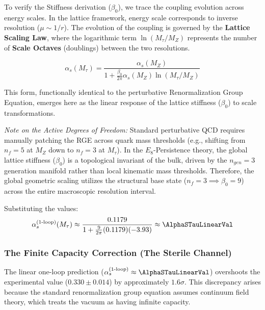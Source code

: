 To verify the Stiffness derivation ($\beta_0$), we trace the coupling evolution across energy scales. In the lattice framework, energy scale corresponds to inverse resolution ($\mu \sim 1/r$). The evolution of the coupling is governed by the \textbf{Lattice Scaling Law}, where the logarithmic term $\ln(M_\tau/M_Z)$ represents the number of \textbf{Scale Octaves} (doublings) between the two resolutions.

\begin{equation}
\alpha_s(M_\tau) = \frac{\alpha_s(M_Z)}{1 + \frac{\beta_0}{2\pi} \alpha_s(M_Z) \ln(M_\tau/M_Z)}
\end{equation}

This form, functionally identical to the perturbative Renormalization Group Equation, emerges here as the linear response of the lattice stiffness ($\beta_0$) to scale transformations.

\textit{Note on the Active Degrees of Freedom:} Standard perturbative QCD requires manually patching the RGE across quark mass thresholds (e.g., shifting from $n_f=5$ at $M_Z$ down to $n_f=3$ at $M_\tau$). In the $E_8$-Persistence theory, the global lattice stiffness ($\beta_0$) is a topological invariant of the bulk, driven by the $n_{gen}=3$ generation manifold rather than local kinematic mass thresholds. Therefore, the global geometric scaling utilizes the structural base state ($n_f = 3 \implies \beta_0 = 9$) across the entire macroscopic resolution interval. 

Substituting the values:
\begin{equation}
\alpha_s^{\text{(1-loop)}}(M_\tau) \approx \frac{0.1179}{1 + \frac{9}{2\pi}(0.1179)(-3.93)} \approx \AlphaSTauLinearVal
\end{equation}


\subsubsection{The Finite Capacity Correction (The Sterile Channel)}

The linear one-loop prediction ($\alpha_s^{\text{(1-loop)}} \approx \AlphaSTauLinearVal$) overshoots the experimental value ($0.330 \pm 0.014$) by approximately $1.6\sigma$. This discrepancy arises because the standard renormalization group equation assumes continuum field theory, which treats the vacuum as having infinite capacity.

